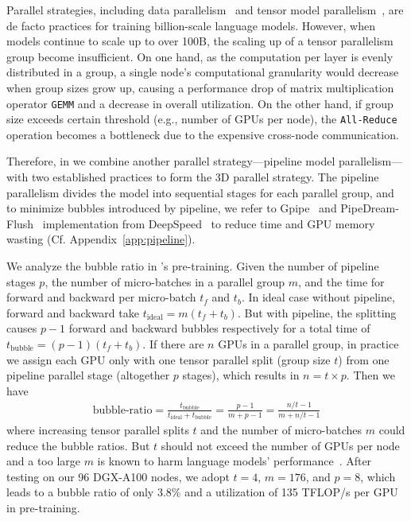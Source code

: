 {{
Parallel strategies, including data parallelism~\citep{valiant1990bridging} and tensor model parallelism~\citep{shoeybi2019megatron}, are de facto practices for training billion-scale language models. 
However, when models continue to scale up to over 100B, the scaling up of a tensor parallelism group become insufficient.
On one hand, as the computation per layer is evenly distributed in a group, a single node's computational granularity would decrease when group sizes grow up, causing a performance drop of matrix multiplication operator \texttt{GEMM} and a decrease in overall utilization.
On the other hand, if group size exceeds certain threshold (e.g., number of GPUs per node), the \texttt{All-Reduce} operation becomes a bottleneck due to the expensive cross-node communication.

Therefore, in \glm we combine another parallel strategy---pipeline model parallelism---with two established practices to form the 3D parallel strategy.
The pipeline parallelism divides the model into sequential stages for each parallel group, and to minimize bubbles introduced by pipeline, we refer to Gpipe~\citep{huang2019gpipe} and PipeDream-Flush~\citep{narayanan2021memory} implementation from DeepSpeed~\citep{rasley2020deepspeed} to reduce time and GPU memory wasting (Cf. Appendix~\ref{app:pipeline}).

We analyze the bubble ratio in \glm's pre-training. Given the number of pipeline stages $p$, the number of micro-batches in a parallel group $m$, and the time for forward and backward per micro-batch $t_f$ and $t_b$. 
In ideal case without pipeline, forward and backward take $t_{\mathrm{ideal}} = m(t_f + t_b)$. 
But with pipeline, the splitting causes $p - 1$ forward and backward bubbles respectively for a total time of $t_{\mathrm{bubble}} = (p - 1)( t_f + t_b)$.
If there are $n$ GPUs in a parallel group, in practice we assign each GPU only with one tensor parallel split (group size $t$) from one pipeline parallel stage (altogether $p$ stages), which results in $n=t\times p$.
Then we have
\begin{equation}
    \begin{split}
        \text{bubble-ratio} = \frac {t_{\mathrm{bubble}}} {t_{\mathrm{ideal}} + t_{\mathrm{bubble}}} = \frac {p - 1} {m + p - 1} = \frac {n/t - 1} {m + n/t - 1} 
    \end{split}
\end{equation}
\noindent where increasing tensor parallel splits $t$ and the number of micro-batches $m$ could reduce the bubble ratios.
But $t$ should not exceed the number of GPUs per node and a too large $m$ is known to harm language models' performance~\citep{you2020large}.
After testing on our 96 DGX-A100 nodes, we adopt $t=4$, $m=176$, and $p=8$, which leads to a bubble ratio of only 3.8\% and a utilization of 135 TFLOP/s per GPU in pre-training.

}}
